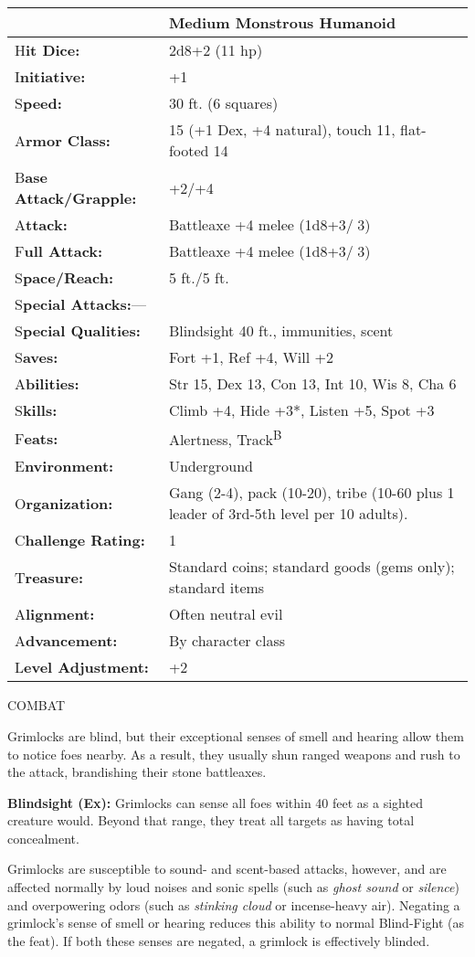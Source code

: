 \documentclass{article}
\begin{document}
\begin{tabular}{|>{\raggedright}p{91pt}|>{\raggedright}p{213pt}|}
\hline
  & Medium Monstrous Humanoid\tabularnewline
\hline
H\textbf{it Dice:} & 2d8+2 (11 hp)\tabularnewline
\hline
I\textbf{nitiative:} & +1\tabularnewline
\hline
S\textbf{peed:} & 30 ft. (6 squares)\tabularnewline
\hline
A\textbf{rmor Class:} & 15 (+1 Dex, +4 natural), touch 11, flat-footed 14\tabularnewline
\hline
B\textbf{ase Attack/Grapple:} & +2/+4\tabularnewline
\hline
A\textbf{ttack:} & Battleaxe +4 melee (1d8+3/3)\tabularnewline
\hline
F\textbf{ull Attack:} & Battleaxe +4 melee (1d8+3/3)\tabularnewline
\hline
S\textbf{pace/Reach:} & 5 ft./5 ft.\tabularnewline
\hline
S\textbf{pecial Attacks:}--- & \tabularnewline
\hline
S\textbf{pecial Qualities:} & Blindsight 40 ft., immunities, scent\tabularnewline
\hline
S\textbf{aves:} & Fort +1, Ref +4, Will +2\tabularnewline
\hline
A\textbf{bilities:} & Str 15, Dex 13, Con 13, Int 10, Wis 8, Cha 6\tabularnewline
\hline
S\textbf{kills:} & Climb +4, Hide +3*, Listen +5, Spot +3\tabularnewline
\hline
F\textbf{eats:} & Alertness, Track\textsuperscript{B}\tabularnewline
\hline
E\textbf{nvironment:} & Underground\tabularnewline
\hline
O\textbf{rganization:} & Gang (2-4), pack (10-20), tribe (10-60 plus 1 leader of 
3rd-5th level per 10 adults).\tabularnewline
\hline
C\textbf{hallenge Rating:} & 1\tabularnewline
\hline
T\textbf{reasure:} & Standard coins; standard goods (gems only); standard items\tabularnewline
\hline
A\textbf{lignment:} & Often neutral evil\tabularnewline
\hline
A\textbf{dvancement:} & By character class\tabularnewline
\hline
L\textbf{evel Adjustment:} & +2\tabularnewline
\hline
\end{tabular}

COMBAT

Grimlocks are blind, but their exceptional senses of smell and hearing allow them 
to notice foes nearby. As a result, they usually shun ranged weapons and rush to 
the attack, brandishing their stone battleaxes.

\textbf{Blindsight (Ex):} Grimlocks can sense all foes within 40 feet as a sighted 
creature would. Beyond that range, they treat all targets as having total concealment. 

Grimlocks are susceptible to sound- and scent-based attacks, however, and are affected 
normally by loud noises and sonic spells (such as \textit{ghost sound }or \textit{silence}) 
and overpowering odors (such as \textit{stinking cloud }or incense-heavy air). 
Negating a grimlock's sense of smell or hearing reduces this ability to normal 
Blind-Fight (as the feat). If both these senses are negated, a grimlock is effectively 
blinded. 
\end{document}
